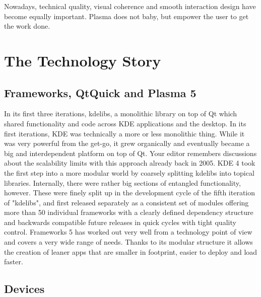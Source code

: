 Nowadays, technical quality, visual coherence and smooth interaction design have become equally important. Plasma does not baby, but empower the user to get the work done.

\section*{The Technology Story}

\subsection*{Frameworks, QtQuick and Plasma 5}

In its first three iterations, kdelibs, a monolithic library on top of Qt which shared functionality and code across KDE applications and the desktop. In its first iterations, KDE was technically a more or less monolithic thing. While it was very powerful from the get-go, it grew organically and eventually became a big and interdependent platform on top of Qt. Your editor remembers discussions about the scalability limits with this approach already back in 2005. KDE 4 took the first step into a more modular world by coarsely splitting kdelibs into topical libraries. Internally, there were rather big sections of entangled functionality, however. These were finely split up in the development cycle of the fifth iteration of "kdelibs", and first released separately as a consistent set of modules offering more than 50 individual frameworks with a clearly defined dependency structure and backwards compatible future releases in quick cycles with tight quality control. Frameworks 5 has worked out very well from a technology point of view and covers a very wide range of needs. Thanks to its modular structure it allows the creation of leaner apps that are smaller in footprint, easier to deploy and load faster.

\subsection*{Devices}

